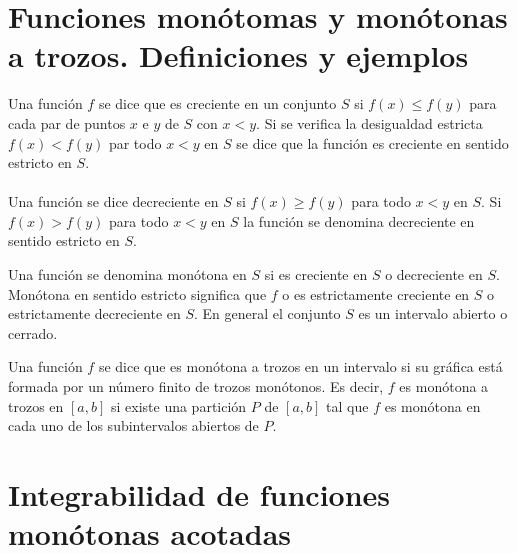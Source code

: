 \setcounter{section}{19}
\section{Funciones monótomas y monótonas a trozos. Definiciones y ejemplos}

\begin{tcolorbox}[colframe=white]
    \begin{def.}
	Una función $f$ se dice que es creciente en un conjunto $S$ si $f(x)\leq f(y)$ para cada par de puntos $x$ e $y$ de $S$ con $x<y$. Si se verifica la desigualdad estricta $f(x)<f(y)$ par todo $x<y$ en $S$ se dice que la función es creciente en sentido estricto en $S$.\\\\
	Una función se dice decreciente en $S$ si $f(x)\geq f(y)$ para todo $x<y$ en $S$. Si $f(x)>f(y)$ para todo $x<y$ en $S$ la función se denomina decreciente en sentido estricto en $S$.
    \end{def.}
\end{tcolorbox}

\begin{tcolorbox}[colframe=white]
    \begin{def.}
	Una función se denomina monótona en $S$ si es creciente en $S$ o decreciente en $S$. Monótona en sentido estricto significa que $f$ o es estrictamente creciente en $S$ o estrictamente decreciente en $S$. En general el conjunto $S$ es un intervalo abierto o cerrado.
    \end{def.}
\end{tcolorbox}

\begin{tcolorbox}[colframe=white]
    \begin{def.}
	Una función $f$ se dice que es monótona a trozos en un intervalo si su gráfica está formada por un número finito de trozos monótonos. Es decir, $f$ es monótona a trozos en $[a,b]$ si existe una partición $P$ de $[a,b]$ tal que $f$ es monótona en cada uno de los subintervalos abiertos de $P$. 
    \end{def.}
\end{tcolorbox}

\section{Integrabilidad de funciones monótonas acotadas}

